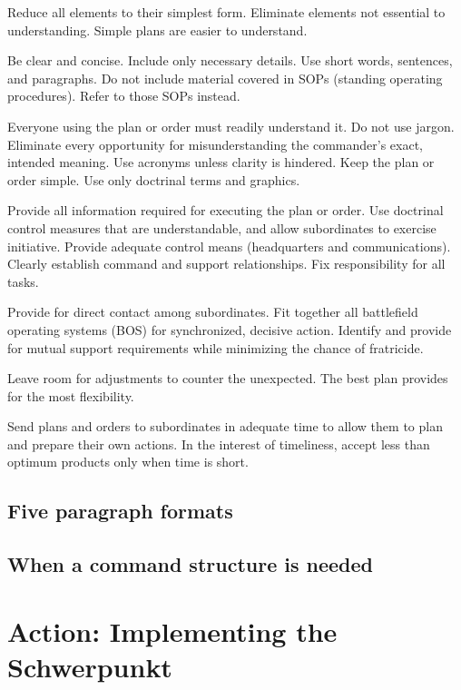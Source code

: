 \documentclass[11pt,fleqn]{memoir} %
\begin{document}
\begin{description}[style=nextline]
          Reduce all elements to their simplest form. Eliminate elements not essential to understanding. Simple plans are easier to understand. 
        \item[Brevity]
          Be clear and concise. Include only necessary details. Use short words, sentences, and paragraphs. Do not include material covered in SOPs (standing operating procedures). Refer to those SOPs instead. 
        \item[Clarity]
          Everyone using the plan or order must readily understand it. Do not use jargon. Eliminate every opportunity for misunderstanding the commander’s exact, intended meaning. Use acronyms unless clarity is hindered. Keep the plan or order simple. Use only doctrinal terms and graphics.  
        \item[Completeness]
          Provide all information required for executing the plan or order. Use doctrinal control measures that are understandable, and allow subordinates to exercise initiative. Provide adequate control means (headquarters and communications). Clearly establish command and support relationships. Fix responsibility for all tasks. 
        \item[Coordination]
          Provide for direct contact among subordinates. Fit together all battlefield operating systems (BOS) for synchronized, decisive action. Identify and provide for mutual support requirements while minimizing the chance of fratricide. 
        \item[Flexibility]
          Leave room for adjustments to counter the unexpected. The best plan provides for the most flexibility. 
        \item[Timeliness]
          Send plans and orders to subordinates in adequate time to allow them to plan and prepare their own actions. In the interest of timeliness, accept less than optimum products only when time is short.
      \end{description}
    \section{Five paragraph formats}
    \section{When a command structure is needed}
  
  \chapter{Action: Implementing the Schwerpunkt}
\end{document}
